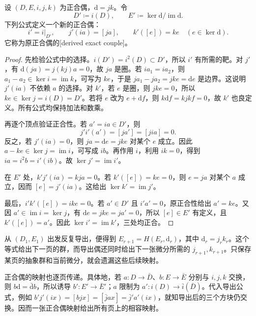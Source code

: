 \begin{theorem}\label{g2:thm:derived-exact-couple}
	设 \((D,E,i,j,k)\) 为正合偶，\(\mathrm d=jk\)。令
	\[
		D'\coloneqq i(D),\qquad E'\coloneqq\ker\mathrm d/\operatorname{im}\mathrm d.
	\]
	下列公式定义一个新的正合偶：
	\[
		i'=i|_{D'},\qquad j'(ia)=[ja],\qquad k'([e])=ke\quad(e\in\ker\mathrm d).
	\]
	它称为原正合偶的[derived exact couple]。
\end{theorem}
\begin{proof}
	先检验公式中的选择。\(i(D')=i^2(D)\subset D'\)，所以 \(i'\) 有所需的靶。对 \(j'\)，有 \(\mathrm d(ja)=j(kj)a=0\)，故 \(ja\) 是圈。若 \(ia_1=ia_2\)，则 \(a_1-a_2\in\ker i=\operatorname{im}k\)，可写为 \(ke\)，于是 \(ja_1-ja_2=jke=\mathrm de\) 是边界。这说明 \(j'(ia)\) 不依赖 \(a\) 的选择。对 \(k'\)，若 \(e\) 是圈，则 \(jke=0\)，所以 \(ke\in\ker j=i(D)=D'\)。若将 \(e\) 改为 \(e+\mathrm df\)，则 \(k\mathrm df=kjkf=0\)，故 \(k'\) 也良定义。所有公式均保持加法和数乘。

	再逐个顶点验证正合性。若 \(a'=ia\in D'\)，则
	\[
		j'i'(a')=[ja']=[jia]=0.
	\]
	反之，若 \(j'(ia)=0\)，则 \(ja=\mathrm de=jke\) 对某个 \(e\) 成立。因此 \(a-ke\in\ker j=\operatorname{im}i\)，可写成 \(ib\)。再作用 \(i\)，利用 \(ik=0\)，得到 \(ia=i^2b=i'(ib)\)。故 \(\ker j'=\operatorname{im}i'\)。

	在 \(E'\) 处，\(k'j'(ia)=kja=0\)。若 \(k'([e])=ke=0\)，则 \(e=ja\) 对某个 \(a\) 成立，因而 \([e]=j'(ia)\)。这给出 \(\ker k'=\operatorname{im}j'\)。

	最后，\(i'k'([e])=ike=0\)。若 \(a'\in D'\) 且 \(i'a'=0\)，原正合性给出 \(a'=ke\)。又因 \(a'\in\operatorname{im}i=\ker j\)，有 \(\mathrm de=jke=ja'=0\)，所以 \([e]\in E'\) 有定义，且 \(k'([e])=a'\)。因此 \(\ker i'=\operatorname{im}k'\)，三处均正合。
\end{proof}

从 \((D_1,E_1)\) 出发反复导出，便得到 \(E_{r+1}=H(E_r,\mathrm d_r)\)，其中 \(\mathrm d_r=j_rk_r\)。这个等式给出下一页的群，而导出偶还同时给出下一张微分所需的 \(j_{r+1},k_{r+1}\)。只保存某页的抽象群和当前微分，就会遗漏这些后续映射。

\ProseParagraphBreak

正合偶的映射也逐页传递。具体地，若 \(a:D\to\bar D\)、\(b:E\to\bar E\) 分别与 \(i,j,k\) 交换，则 \(b\mathrm d=\bar{\mathrm d}b\)，所以诱导 \(b':E'\to\bar E'\)；\(a\) 限制为 \(a':i(D)\to\bar i(\bar D)\)。代入导出公式，例如 \(b'j'(ix)=[b jx]=[\bar j ax]=\bar j'a'(ix)\)，就知导出后的三个方块仍交换。因而一张正合偶映射给出所有页上的相容映射。

